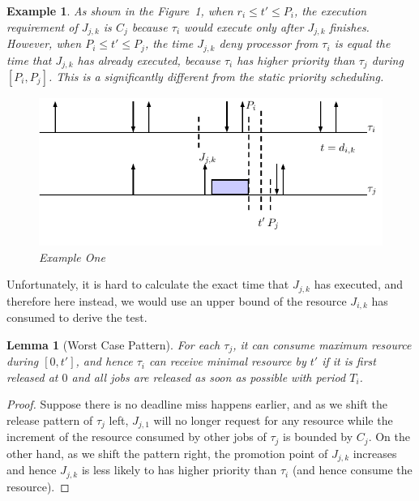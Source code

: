 \documentclass[12pt,conference,onecolumn]{IEEEtran}
\newtheorem{proof}{Proof}
\newtheorem{lemma}{Lemma}
\newtheorem{example}{Example}
\begin{document}
\begin{example}
As shown in the Figure~1, when $r_i\leq t'\leq P_i$, the execution requirement of $J_{j,k}$ is $C_j$ because $\tau_i$  would execute only after $J_{j,k}$ finishes. However, when $P_i\leq t'\leq P_j$,  the time $J_{j,k}$ deny processor from $\tau_i$ is equal the time that $J_{j,k}$ has already executed, because $\tau_i$ has higher priority than $\tau_j$ during $[P_i,P_j]$.  This is a significantly different from the  static priority scheduling.
\begin{figure}[h!]
 \centering
\includegraphics[scale=1]{Figure/E1}  
\caption{Example One}
  \label{fig:p3}
\end{figure}
\end{example}

Unfortunately, it is hard to calculate the exact time that  $J_{j,k}$  has executed, and therefore here instead,  we would use an upper bound of the resource $J_{i,k}$ has consumed to derive the test.

\begin{lemma}[Worst Case Pattern]
For each $\tau_j$, it can consume maximum resource during $[0,t']$, and hence $\tau_i$ can receive minimal resource by $t'$ if it is first released at $0$ and all jobs are released as soon as possible with period $T_i$. 
\end{lemma}
\begin{proof}
Suppose there is no deadline miss happens earlier, and as we shift the release pattern of $\tau_j$ left, $J_{j,1}$ will no longer request for any resource while the increment of the resource consumed by other jobs of $\tau_j$ is bounded by $C_j$. On the other hand, as we shift the pattern right, the promotion point of $J_{j,k}$  increases and hence $J_{j,k}$ is less likely to has higher priority than $\tau_i$ (and hence consume the resource).
\end{proof}
\end{document}
